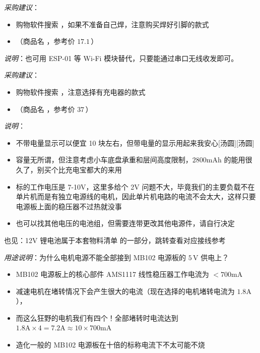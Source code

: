 \documentclass[11pt,a4paper]{article}
\begin{document}
\emph{采购建议}：

\begin{itemize}
  \item 购物软件搜索 ，如果不准备自己焊，注意购买焊好引脚的款式
  \item {}（商品名 ，参考价 $17.1$\,\yuan）
\end{itemize}

\emph{说明}：也可用 ESP-01 等 Wi-Fi 模块替代，只要能通过串口无线收发即可。

\label{pt:battery}

\emph{采购建议}：

\begin{itemize}
  \item 购物软件搜索 ，注意选择有充电器的款式
  \item {}（商品名 ，参考价 $37$\,\yuan）
\end{itemize}

\emph{说明}：

\begin{itemize}
  \item 不带电量显示可以便宜 10 块左右，但带电量的显示用起来我安心[汤圆][汤圆]
  \item 容量无所谓，但注意考虑小车底盘承重和层间高度限制，$2800\mathrm{mAh}$ 的能用很久了，别买个比充电宝都大的来用
  \item {}标的工作电压是 7-10V，这里多给个 2V 问题不大，毕竟我们的主要负载不在单片机而是有独立电源线的电机，因此单片机电路的电流不会太大，这样只要电源板上面的稳压器不过热就没事
  \item 也可以找其他电压的电池组，但需要连带更改其他电源件，请自行决定
\end{itemize}

\begin{seealso}
  也见：12V 锂电池属于本套物料清单  的一部分，跳转查看对应接线参考
\end{seealso}

\label{pt:dcdc}

\emph{用途说明}：为什么电机电源不能全部接到 MB102 电源板的 $5\,\mathrm{V}$ 供电上？

\begin{itemize}
  \item MB102 电源板上的核心部件 AMS1117 线性稳压器工作电流为 $<700\mathrm{mA}$
  \item 减速电机在堵转情况下会产生很大的电流（现在选择的电机堵转电流为 $1.8\mathrm{A}$），
  \item 而这么狂野的电机我们有四个！全部堵转时电流达到 $1.8\mathrm{A}\times 4=7.2\mathrm{A}\approx 10\times 700\mathrm{mA}$
  \item 造化一般的 MB102 电源板在十倍的标称电流下不太可能不烧
\end{itemize}
\end{document}
